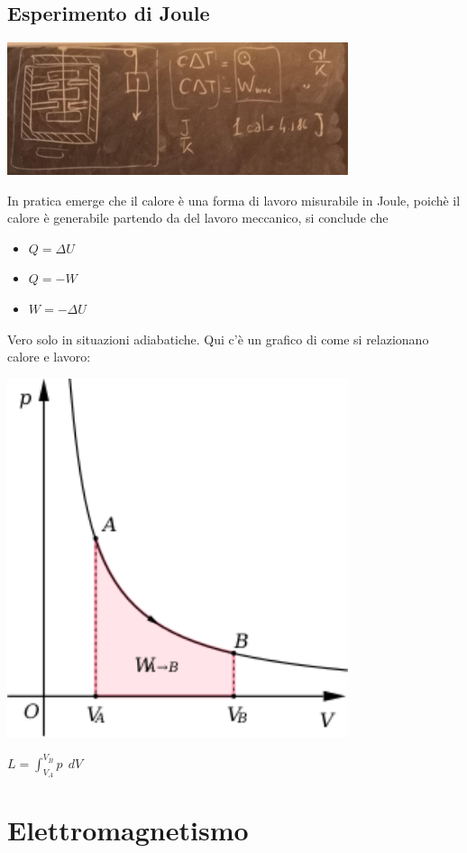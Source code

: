 \documentclass[12pt, a4paper, openany, oneside]{book}
\begin{document}
\section{Esperimento di Joule}
\begin{center}
\includegraphics[width=0.75\textwidth]{17}
\end{center}
In pratica emerge che il calore è una forma di lavoro misurabile in Joule, 
poichè il calore è generabile partendo da del lavoro meccanico, si conclude che
\begin{itemize}
	\item $Q = \Delta U$
	\item $Q = -W$
	\item $W = -\Delta U $
\end{itemize}
Vero solo in situazioni adiabatiche. Qui c'è un grafico di come si relazionano
calore e lavoro:
\begin{center}
\includegraphics[width=0.75\textwidth]{18}
\end{center}
$L = \int_{V_{A}}^{V_{B}} p~~ dV$
\chapter{Elettromagnetismo}
\end{document}
